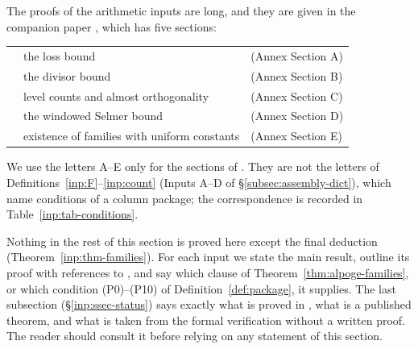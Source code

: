 \documentclass[10pt]{amsart}
\theoremstyle{definition}
\theoremstyle{remark}
\begin{document}
The proofs of the arithmetic inputs are long, and they are given in the
companion paper \cite{Annex}, which has five sections:
\begin{center}
\begin{tabular}{lll}
\cite[Section~\ref{A-i1:sec}]{Annex} & the loss bound & (Annex Section A)\\
\cite[Section~\ref{A-i2:sec}]{Annex} & the divisor bound & (Annex Section B)\\
\cite[Section~\ref{A-i3:sec}]{Annex} & level counts and almost orthogonality & (Annex Section C)\\
\cite[Section~\ref{A-i5:sec}]{Annex} & the windowed Selmer bound & (Annex Section D)\\
\cite[Section~\ref{A-i4:sec}]{Annex} & existence of families with uniform constants & (Annex Section E)
\end{tabular}
\end{center}
We use the letters A--E only for the sections of \cite{Annex}. They are
not the letters of Definitions~\ref{inp:F}--\ref{inp:count} (Inputs A--D of
\S\ref{subsec:assembly-dict}), which name conditions of a column
package; the correspondence is recorded in Table~\ref{inp:tab-conditions}.

Nothing in the rest of this section is proved here except the final deduction
(Theorem~\ref{inp:thm-families}). For each input we state the main result,
outline its proof with references to \cite{Annex}, and say which clause of
Theorem~\ref{thm:alpoge-families}, or which condition (P0)--(P10) of
Definition~\ref{def:package}, it supplies. The last subsection
(\S\ref{inp:ssec-status}) says exactly what is proved in \cite{Annex}, what
is a published theorem, and what is taken from the formal verification
\cite{CharacterFamily} without a written proof. The reader should consult
it before relying on any statement of this section.
\end{document}
